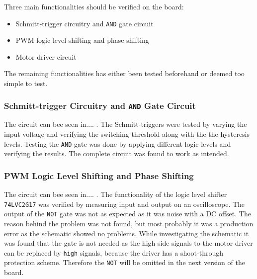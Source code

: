 Three main functionalities should be verified on the board:

\begin{itemize}
	\item Schmitt-trigger circuitry and \texttt{AND} gate circuit
	\item PWM logic level shifting and phase shifting
	\item Motor driver circuit
\end{itemize}

The remaining functionalities has either been tested beforehand or deemed too simple to test. 

\subsubsection{Schmitt-trigger Circuitry and \texttt{AND} Gate Circuit}
The circuit can bee seen in.... .
The Schmitt-triggers were tested by varying the input voltage and verifying the switching threshold along with the the hysteresis levels. 
Testing the \texttt{AND} gate was done by applying different logic levels and verifying the results.
The complete circuit was found to work as intended.

\subsubsection{PWM Logic Level Shifting and Phase Shifting}
The circuit can bee seen in.... .
The functionality of the logic level shifter \texttt{74LVC2G17} was verified by measuring input and output on an oscilloscope. 
The output of the \texttt{NOT} gate was not as expected as it was noise with a DC offset. 
The reason behind the problem was not found, but most probably it was a production error as the schematic showed no problems.
While investigating the schematic it was found that the gate is not needed as the high side signals to the motor driver can be replaced by \texttt{high} signals, because the driver has a shoot-through protection scheme.
Therefore the \texttt{NOT} will be omitted in the next version of the board.

